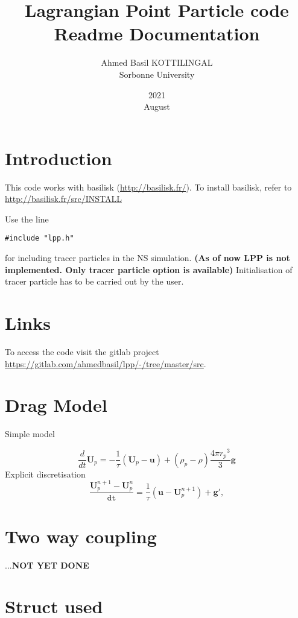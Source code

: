 \documentclass[a4paper,12pt]{article}
\title{Lagrangian Point Particle code Readme Documentation}
\date{2021\\ August}
\author{Ahmed Basil KOTTILINGAL\\ Sorbonne University}
\begin{document}
    
    \maketitle
    
    \section{Introduction}
    
    This code works with basilisk (\url{http://basilisk.fr/}). To install basilisk, refer to \url{http://basilisk.fr/src/INSTALL}
    
    Use the line
    \begin{lstlisting}[style=CStyle]
    #include "lpp.h" 
    \end{lstlisting}
    for including tracer particles in the NS simulation. \textbf{(As of now LPP is not implemented. Only tracer particle option is available)}
    Initialisation of tracer particle has to be carried out by the user. 
    
    
    
    \section{Links}
    To access the code visit the gitlab project \url{https://gitlab.com/ahmedbasil/lpp/-/tree/master/src}.
    
    \section{Drag Model}
    
    Simple model
    
    $$\frac{d }{d t} \mathbf{U}_p = - \frac{1}{\tau}\left(\mathbf{U}_p - \mathbf{u}\right) + (\rho_p - \rho) \frac{4 \pi {r_p}^3}{3} \mathbf{g} $$
    Explicit discretisation
    $$\frac{\mathbf{U}_p^{n+1}-\mathbf{U}_p^n}{\mathtt{dt}} = \frac{1}{\tau}\left(\mathbf{u} - \mathbf{U}_p^{n+1}\right) + \mathbf{g}',$$
    
    \section{Two way coupling}
     ...\textbf{NOT YET DONE}
    \section{Struct used}
    
\end{document}
